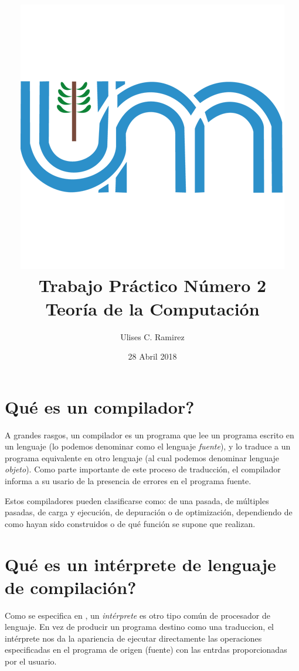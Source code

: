 \documentclass{article}
\begin{document}
\title{\includegraphics{unam-logo.png}\\Trabajo Pr\'actico N\'umero 2\\Teor\'ia de la Computaci\'on}
\author{Ulises C. Ramirez}
\date{28 Abril 2018}
\maketitle
{}
\newpage

\section{{\textquestiondown}Qu\'e es un compilador?}
A grandes rasgos, un compilador es un programa que lee un programa escrito en un lenguaje (lo podemos denominar como el lenguaje \textit{fuente}), y lo traduce a un programa equivalente en otro lenguaje (al cual podemos denominar lenguaje \textit{objeto}). Como parte importante de este proceso de traducci\'on, el compilador informa a su usario de la presencia de errores en el programa fuente.

Estos compiladores pueden clasificarse como: de una pasada, de m\'ultiples pasadas, de carga y ejecuci\'on, de depuraci\'on o de optimizaci\'on, dependiendo de como hayan sido construidos o de qu\'e funci\'on se supone que realizan.

\section{ {\textquestiondown} Qu\'e es un int\'erprete de lenguaje de compilaci\'on?}
Como se especifica en \cite{comppth}, un \textit{int\'erprete} es otro tipo com\'un de procesador de lenguaje. En vez de producir un programa destino como una traduccion, el int\'erprete nos da la apariencia de ejecutar directamente las operaciones especificadas en el programa de origen (fuente) con las entrdas proporcionadas por el usuario.
\end{document}
